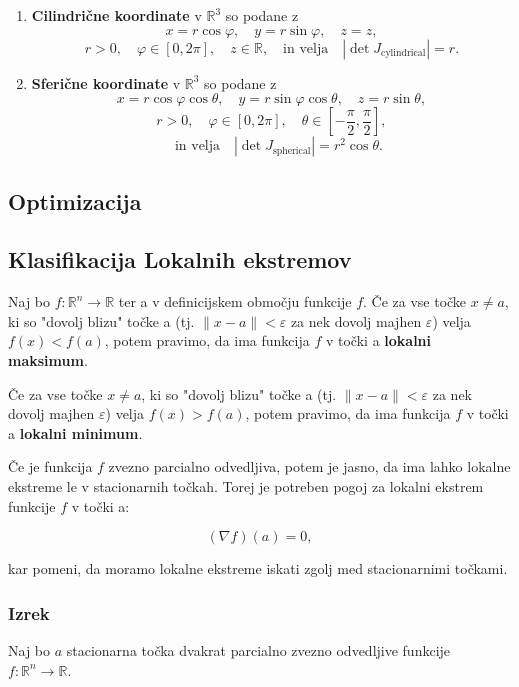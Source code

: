\documentclass{article}
\begin{document}
\begin{multicols}{2}
\begin{enumerate}
		\item \textbf{Cilindrične koordinate} v \( \mathbb{R}^3 \) so podane z
		      \[
			      x = r \cos \varphi, \quad y = r \sin \varphi, \quad z = z,
		      \]
		      \[
			      r > 0, \quad \varphi \in [0, 2\pi], \quad z \in \mathbb{R}, \quad \text{in velja} \quad |\det J_{\text{cylindrical}}| = r.
		      \]

		\item \textbf{Sferične koordinate} v \( \mathbb{R}^3 \) so podane z
		      \[
			      x = r \cos \varphi \cos \theta, \quad y = r \sin \varphi \cos \theta, \quad z = r \sin \theta,
		      \]
		      \[
			      r > 0, \quad \varphi \in [0, 2\pi], \quad \theta \in \left[-\frac{\pi}{2}, \frac{\pi}{2}\right],
		      \]
		      \[
			      \quad \text{in velja} \quad |\det J_{\text{spherical}}| = r^2 \cos \theta.
		      \]
	\end{enumerate}


	\subsection{Optimizacija}

	\subsection{Klasifikacija Lokalnih ekstremov}

	Naj bo \( f: \mathbb{R}^n \rightarrow \mathbb{R} \) ter a v definicijskem območju funkcije \( f \).
	Če za vse točke \( x \neq a \), ki so "dovolj blizu" točke a (tj. \( \| x - a \| < \varepsilon \) za nek dovolj majhen \( \varepsilon \)) velja \( f(x) < f(a) \),
	potem pravimo, da ima funkcija \( f \) v točki a \textbf{lokalni maksimum}.

	Če za vse točke \( x \neq a \), ki so "dovolj blizu" točke a (tj. \( \| x - a \| < \varepsilon \) za nek dovolj majhen \( \varepsilon \)) velja \( f(x) > f(a) \),
	potem pravimo, da ima funkcija \( f \) v točki a \textbf{lokalni minimum}.

	Če je funkcija \( f \) zvezno parcialno odvedljiva, potem je jasno, da ima lahko lokalne ekstreme le v stacionarnih točkah. Torej je potreben pogoj za lokalni ekstrem funkcije \( f \) v točki a:

	\[ (\nabla f)(a) = 0, \]

	kar pomeni, da moramo lokalne ekstreme iskati zgolj med stacionarnimi točkami.

	\subsubsection{Izrek}
	Naj bo \( a \) stacionarna točka dvakrat parcialno zvezno odvedljive funkcije \( f: \mathbb{R}^n \rightarrow \mathbb{R} \).


\end{multicols}
\end{document}
